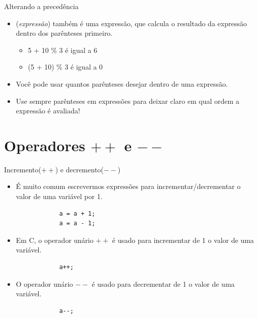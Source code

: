 \documentclass[handout]{beamer}
\begin{document}

\begin{frame}[fragile]{Alterando a precedência}
    \begin{itemize}[<+->]
        \item ({\it expressão}) também é uma expressão, que calcula o resultado da expressão dentro dos parênteses primeiro.
        \begin{itemize}
            \item 5 + 10 \% 3 é igual a 6
            \item (5 + 10) \% 3 é igual a 0
        \end{itemize}

        \item Você pode usar quantos parênteses desejar dentro de uma expressão.
        \item Use sempre parênteses em expressões para deixar claro em qual ordem a expressão é avaliada!
    \end{itemize}
\end{frame}


\section{Operadores $++$ e $--$}

\begin{frame}[fragile]{Incremento($++$) e decremento($--$)}

    \begin{itemize}[<+->]
        \item É muito comum escrevermos expressões para incrementar/decrementar o valor de uma variável por 1.
        \begin{verbatim}
            a = a + 1;
            a = a - 1;
        \end{verbatim}

        \item Em C, o operador unário $++$ é  usado para incrementar de 1 o valor de uma variável.
        \begin{verbatim}
            a++;
        \end{verbatim}

        \item O operador unário $--$ é usado para decrementar de 1 o valor de uma variável.
        \begin{verbatim}
            a--;
        \end{verbatim}

    \end{itemize}
\end{frame}
\end{document}
